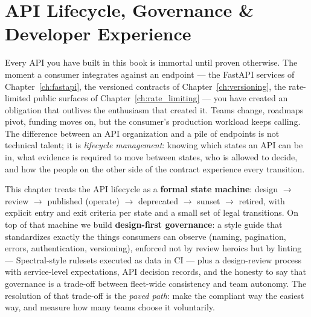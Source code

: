 \chapter{API Lifecycle, Governance \& Developer Experience}
\label{ch:lifecycle}

Every API you have built in this book is immortal until proven otherwise.
The moment a consumer integrates against an endpoint --- the FastAPI
services of Chapter~\ref{ch:fastapi}, the versioned contracts of
Chapter~\ref{ch:versioning}, the rate-limited public surfaces of
Chapter~\ref{ch:rate_limiting} --- you have created an obligation that
outlives the enthusiasm that created it. Teams change, roadmaps pivot,
funding moves on, but the consumer's production workload keeps calling.
The difference between an API organization and a pile of endpoints is not
technical talent; it is \emph{lifecycle management}: knowing which states
an API can be in, what evidence is required to move between states, who is
allowed to decide, and how the people on the other side of the contract
experience every transition.

This chapter treats the API lifecycle as a \textbf{formal state machine}:
\textsf{design} $\rightarrow$ \textsf{review} $\rightarrow$
\textsf{published} (operate) $\rightarrow$ \textsf{deprecated}
$\rightarrow$ \textsf{sunset} $\rightarrow$ \textsf{retired}, with explicit
entry and exit criteria per state and a small set of legal transitions.
On top of that machine we build \textbf{design-first governance}: a style
guide that standardizes exactly the things consumers can observe (naming,
pagination, errors, authentication, versioning), enforced not by review
heroics but by linting --- Spectral-style rulesets executed as data in CI
--- plus a design-review process with service-level expectations, API
decision records, and the honesty to say that governance is a trade-off
between fleet-wide consistency and team autonomy. The resolution of that
trade-off is the \emph{paved path}: make the compliant way the easiest
way, and measure how many teams choose it voluntarily.

